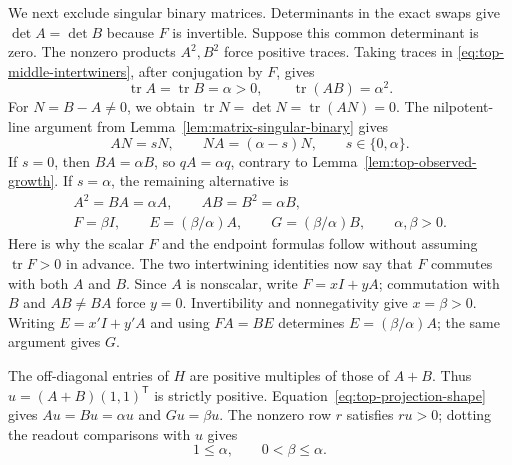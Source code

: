 \documentclass[11pt,a4paper]{article}
\newcommand{\tr}{\operatorname{tr}}
\begin{document}
We next exclude singular binary matrices. Determinants in the exact
swaps give $\det A=\det B$ because $F$ is invertible.
Suppose this common determinant is zero. The nonzero products
$A^2,B^2$ force positive traces. Taking traces in
\eqref{eq:top-middle-intertwiners}, after conjugation by $F$, gives
\[
\tr A=\tr B=\alpha>0,\qquad \tr(AB)=\alpha^2.
\]
For $N=B-A\ne0$, we obtain
$\tr N=\det N=\tr(AN)=0$. The nilpotent-line argument from
Lemma~\ref{lem:matrix-singular-binary} gives
\[
AN=sN,\qquad NA=(\alpha-s)N,\qquad s\in\{0,\alpha\}.
\]
If $s=0$, then $BA=\alpha B$, so $qA=\alpha q$, contrary
to Lemma~\ref{lem:top-observed-growth}.
If $s=\alpha$, the remaining alternative is
\begin{equation}\label{eq:top-projection-shape}
\begin{gathered}
A^2=BA=\alpha A,\qquad AB=B^2=\alpha B,\\
F=\beta I,\qquad E=(\beta/\alpha)A,\qquad
G=(\beta/\alpha)B,\qquad \alpha,\beta>0.
\end{gathered}
\end{equation}
Here is why the scalar $F$ and the endpoint formulas follow without
assuming $\tr F>0$ in advance. The two intertwining identities now
say that $F$ commutes with both $A$ and $B$. Since $A$ is nonscalar,
write $F=xI+yA$; commutation with $B$ and $AB\ne BA$ force $y=0$.
Invertibility and nonnegativity give $x=\beta>0$.
Writing $E=x'I+y'A$ and using $FA=BE$ determines
$E=(\beta/\alpha)A$; the same argument gives $G$.

The off-diagonal entries of $H$ are positive multiples of those of
$A+B$. Thus $u=(A+B)(1,1)^{\mathsf T}$ is strictly positive.
Equation~\eqref{eq:top-projection-shape} gives
$Au=Bu=\alpha u$ and $Gu=\beta u$.
The nonzero row $r$ satisfies $ru>0$; dotting the readout comparisons
with $u$ gives
\begin{equation}\label{eq:top-projection-bounds}
1\le\alpha,\qquad 0<\beta\le\alpha.
\end{equation}
\end{document}
